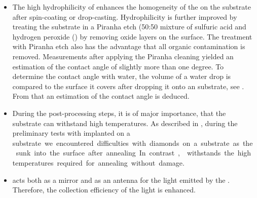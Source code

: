 	\begin{itemize}
		\item The high hydrophilicity of \ir enhances the homogeneity of the \nds on the substrate after spin-coating or drop-casting. Hydrophilicity is further improved by treating the substrate in a Piranha etch (50:50 mixture of sulfuric acid  and hydrogen peroxide () by removing oxide layers on the surface.
		The treatment with Piranha etch also has the advantage that all organic contamination is removed.
		Measurements after applying the Piranha cleaning yielded an estimation of the contact angle of slightly more than one degree.
		To determine the contact angle with water, the volume of a water drop is compared to the surface it covers after dropping it onto an \ir substrate, see . From that an estimation of the contact angle is deduced.
		\item During the post-processing steps, it is of major importance, that the substrate can withstand high temperatures.
		As described in , during the preliminary tests with implanted \nds on a \si substrate we encountered difficulties with diamonds on a \si substrate as the sunk into the surface after annealing.
		In contrast, \ir withstands the high temperatures required for annealing without damage.
		\item \Ir acts both as a mirror and as an antenna for the \fl light emitted by the \siv \cite{Neu2012a}.
		Therefore, the collection efficiency of the \fl light is enhanced.
	\end{itemize}


